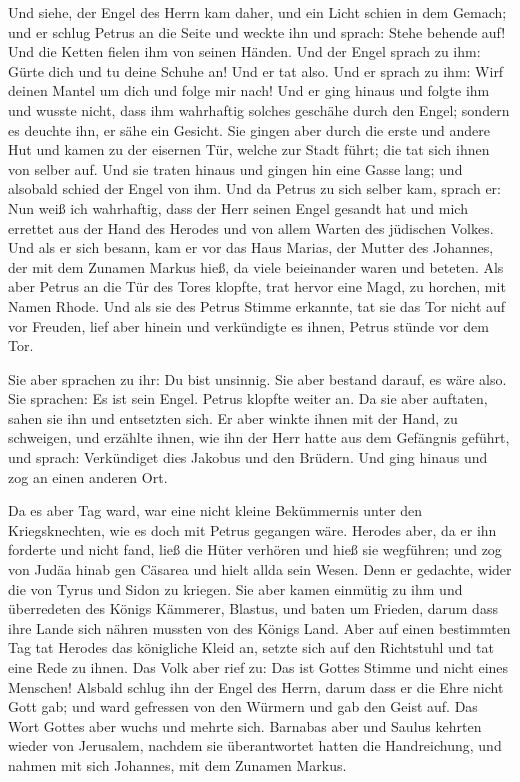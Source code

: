  Und siehe, der Engel des Herrn kam daher, und ein Licht
schien in dem Gemach; und er schlug Petrus an die Seite und weckte ihn
und sprach: Stehe behende auf! Und die Ketten fielen ihm von seinen
Händen.  Und der Engel sprach zu ihm: Gürte dich und tu
deine Schuhe an! Und er tat also. Und er sprach zu ihm: Wirf deinen
Mantel um dich und folge mir nach!  Und er ging hinaus und
folgte ihm und wusste nicht, dass ihm wahrhaftig solches geschähe durch
den Engel; sondern es deuchte ihn, er sähe ein Gesicht. 
Sie gingen aber durch die erste und andere Hut und kamen zu der eisernen
Tür, welche zur Stadt führt; die tat sich ihnen von selber auf. Und sie
traten hinaus und gingen hin eine Gasse lang; und alsobald schied der
Engel von ihm.  Und da Petrus zu sich selber kam, sprach
er: Nun weiß ich wahrhaftig, dass der Herr seinen Engel gesandt hat und
mich errettet aus der Hand des Herodes und von allem Warten des
jüdischen Volkes.  Und als er sich besann, kam er vor das
Haus Marias, der Mutter des Johannes, der mit dem Zunamen Markus hieß,
da viele beieinander waren und beteten.  Als aber Petrus
an die Tür des Tores klopfte, trat hervor eine Magd, zu horchen, mit
Namen Rhode.  Und als sie des Petrus Stimme erkannte, tat
sie das Tor nicht auf vor Freuden, lief aber hinein und verkündigte es
ihnen, Petrus stünde vor dem Tor.

 Sie aber sprachen zu ihr: Du bist unsinnig. Sie aber
bestand darauf, es wäre also. Sie sprachen: Es ist sein Engel.
 Petrus klopfte weiter an. Da sie aber auftaten, sahen
sie ihn und entsetzten sich.  Er aber winkte ihnen mit
der Hand, zu schweigen, und erzählte ihnen, wie ihn der Herr hatte aus
dem Gefängnis geführt, und sprach: Verkündiget dies Jakobus und den
Brüdern. Und ging hinaus und zog an einen anderen Ort.

 Da es aber Tag ward, war eine nicht kleine Bekümmernis
unter den Kriegsknechten, wie es doch mit Petrus gegangen wäre.
 Herodes aber, da er ihn forderte und nicht fand, ließ
die Hüter verhören und hieß sie wegführen; und zog von Judäa hinab gen
Cäsarea und hielt allda sein Wesen.  Denn er gedachte,
wider die von Tyrus und Sidon zu kriegen. Sie aber kamen einmütig zu ihm
und überredeten des Königs Kämmerer, Blastus, und baten um Frieden,
darum dass ihre Lande sich nähren mussten von des Königs Land.
 Aber auf einen bestimmten Tag tat Herodes das königliche
Kleid an, setzte sich auf den Richtstuhl und tat eine Rede zu ihnen.
 Das Volk aber rief zu: Das ist Gottes Stimme und nicht
eines Menschen!  Alsbald schlug ihn der Engel des Herrn,
darum dass er die Ehre nicht Gott gab; und ward gefressen von den
Würmern und gab den Geist auf.  Das Wort Gottes aber
wuchs und mehrte sich.  Barnabas aber und Saulus kehrten
wieder von Jerusalem, nachdem sie überantwortet hatten die Handreichung,
und nahmen mit sich Johannes, mit dem Zunamen Markus.

